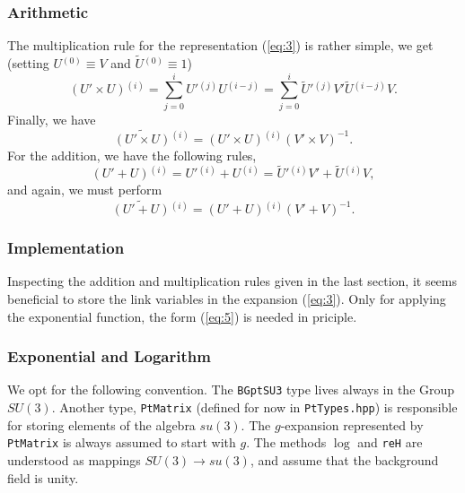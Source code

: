 \documentclass[a4paper]{scrartcl}
\newcommand{\ord}[1]{\ensuremath{^{(#1)}}}
\begin{document}
\subsubsection{Arithmetic}
\label{sec:arithmetic}

The multiplication rule for the representation (\ref{eq:3}) is rather
simple, we get (setting $U\ord 0 \equiv V$ and $\tilde U \ord 0 \equiv
1$)
%
\begin{equation}
  \label{eq:8}
  \left ( U' \times U \right)\ord i = \sum_{j = 0}^{i} {U'}\ord j U
  \ord{i-j} = \sum_{j = 0}^{i} {\tilde U '}\hspace{0em}\ord j V' 
  {\tilde U} \ord {i- j}V.
\end{equation}
%
Finally, we have
%
\begin{equation}
  \label{eq:9}
  \widetilde {\left( U' \times U \right)}\ord i = \left ( U' \times U
  \right)\ord i \left(V'\times V \right)^{-1}.
\end{equation}
%
For the addition, we have the following rules,
%
\begin{equation}
  \label{eq:10}
  \left ( U' + U \right)\ord i = {U'}\ord i + U \ord i = {\tilde U'}
  \hspace{0em}\ord i V' + {\tilde U}\ord i V,
\end{equation}
%
and again, we must perform
%
\begin{equation}
  \label{eq:11}
  \widetilde {\left( U' + U\right)}\ord i = \left ( U' + U
  \right)\ord i \left(V' + V \right)^{-1}.
\end{equation}

\subsubsection{Implementation}
\label{sec:implementation}

Inspecting the addition and multiplication rules given in the last
section, it seems beneficial to store the link variables in the
expansion (\ref{eq:3}). Only for applying the exponential function,
the form (\ref{eq:5}) is needed in priciple.

\subsubsection{Exponential and Logarithm}
\label{sec:expon-logar}

We opt for the following convention. The \texttt{BGptSU3} type lives
always in the Group $SU(3)$. Another type, \texttt{PtMatrix} (defined
for now in \texttt{PtTypes.hpp}) is responsible for storing elements
of the algebra $su(3)$. The $g$-expansion represented by
\texttt{PtMatrix} is always assumed to start with $g$. The methods
$\log$ and \texttt{reH} are understood as mappings $SU(3) \to su(3)$,
and assume that the background field is unity.
\end{document}

